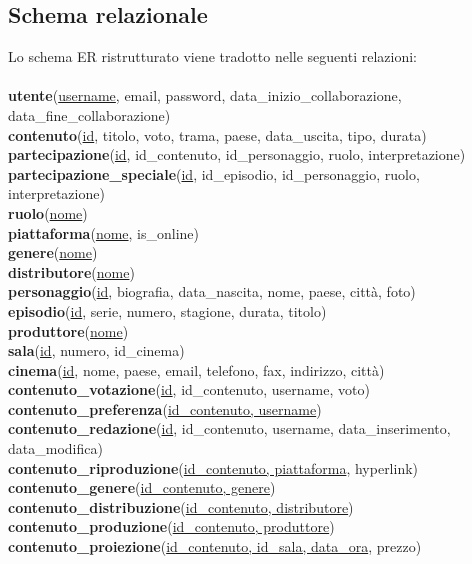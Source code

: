 \documentclass[a4paper]{article}
\begin{document}
\subsection{Schema relazionale}
Lo schema ER ristrutturato viene tradotto nelle seguenti relazioni:\\\\
\textbf{utente}(\underline{username}, email, password, data\_inizio\_collaborazione, data\_fine\_collaborazione)\\
\textbf{contenuto}(\underline{id}, titolo, voto, trama, paese, data\_uscita, tipo, durata)\\
\textbf{partecipazione}(\underline{id}, id\_contenuto, id\_personaggio, ruolo, interpretazione)\\
\textbf{partecipazione\_speciale}(\underline{id}, id\_episodio, id\_personaggio, ruolo, interpretazione)\\
\textbf{ruolo}(\underline{nome})\\
\textbf{piattaforma}(\underline{nome}, is\_online)\\
\textbf{genere}(\underline{nome})\\
\textbf{distributore}(\underline{nome})\\
\textbf{personaggio}(\underline{id}, biografia, data\_nascita, nome, paese, città, foto)\\
\textbf{episodio}(\underline{id}, serie, numero, stagione, durata, titolo)\\
\textbf{produttore}(\underline{nome})\\
\textbf{sala}(\underline{id}, numero, id\_cinema)\\
\textbf{cinema}(\underline{id}, nome, paese, email, telefono, fax, indirizzo, città)\\
\textbf{contenuto\_votazione}(\underline{id}, id\_contenuto, username, voto)\\
\textbf{contenuto\_preferenza}(\underline{id\_contenuto, username})\\
\textbf{contenuto\_redazione}(\underline{id}, id\_contenuto, username, data\_inserimento, data\_modifica)\\
\textbf{contenuto\_riproduzione}(\underline{id\_contenuto, piattaforma}, hyperlink)\\
\textbf{contenuto\_genere}(\underline{id\_contenuto, genere})\\
\textbf{contenuto\_distribuzione}(\underline{id\_contenuto, distributore})\\
\textbf{contenuto\_produzione}(\underline{id\_contenuto, produttore})\\
\textbf{contenuto\_proiezione}(\underline{id\_contenuto, id\_sala, data\_ora}, prezzo)\\
\end{document}
